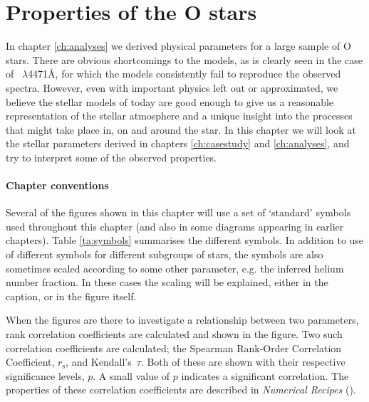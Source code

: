 \chapter{Properties of the O stars}
\label{ch:odiscuss}

In chapter \ref{ch:analyses} we derived physical parameters for a
large sample of O stars.  There are obvious shortcomings to the
models, as is clearly seen in the case of \hei~$\lambda$4471\AA, for
which the models consistently fail to reproduce the observed
spectra. However, even with important physics left out or
approximated, we believe the stellar models of today are good enough
to give us a reasonable representation of the stellar atmosphere
and a unique insight into the processes that might take place in, on
and around the star. In this chapter we will look at the stellar
parameters derived in chapters \ref{ch:casestudy} and
\ref{ch:analyses}, and try to interpret some of the observed properties.

\subsubsection{Chapter conventions}
Several of the figures shown in this chapter will use a set of
`standard' symbols used throughout this chapter (and also in some
diagrams appearing in earlier chapters). Table \ref{ta:symbols}
summarises the different symbols. In addition to use of different
symbols for different subgroups of stars, the symbols are also
sometimes scaled according to some other parameter, e.g. the inferred
helium number fraction. In these cases the scaling will be explained,
either in the caption, or in the figure itself.

When the figures are there to investigate a relationship between two
parameters, rank correlation coefficients are calculated and shown in
the figure. Two such correlation coefficients are calculated; the Spearman
Rank-Order Correlation Coefficient, $r_\mathrm{s}$, and Kendall's~$\tau$.
Both of these are shown with their respective significance levels,
$p$. A small value of $p$ indicates a significant correlation. The
properties of these correlation coefficients are described in
\emph{Numerical Recipes} (\cite{nr}).

